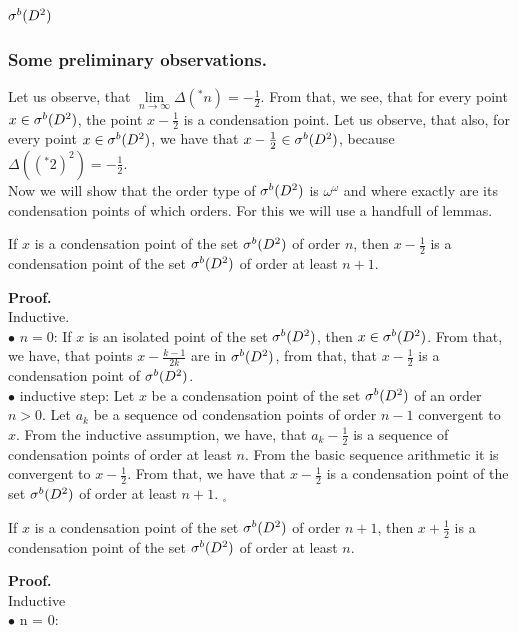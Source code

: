 \subsection{${\mathcal{\sigma}^b(D^2)}$}
\subsubsection{Some preliminary observations.}
Let us observe, that $\lim\limits_{n \to \infty} \Delta(^*n) = -\frac{1}{2}$. From that, we see, 
that for every point $x \in {\mathcal{\sigma}^b(D^2)}$, the point $x - \frac{1}{2}$ is a condensation point. 
Let us observe, that also, for every point $x \in {\mathcal{\sigma}^b(D^2)}$, we have that $x - \frac{1}{2} \in {\mathcal{\sigma}^b(D^2)}$, 
because $\Delta((^*2)^2) = -\frac{1}{2}$. \\

Now we will show that the order type of ${\mathcal{\sigma}^b(D^2)}$ is $\omega^\omega$ and where exactly are 
its condensation points of which orders. For this we will use  
a handfull of lemmas. 

\begin{lemma}
If $x$ is a condensation point of the set ${\mathcal{\sigma}^b(D^2)}$ of order $n$, then $x-\frac{1}{2}$ is a
 condensation point of the set ${\mathcal{\sigma}^b(D^2)}$ of order at least $n+1$. 
\end{lemma}
\textbf{Proof.} \\
Inductive. \\
$\bullet$ $n = 0$: If $x$ is an isolated point of the set ${\mathcal{\sigma}^b(D^2)}$, then $x \in {\mathcal{\sigma}^b(D^2)}$. From that, we 
have, that points $x - \frac{k-1}{2k}$ are in ${\mathcal{\sigma}^b(D^2)}$, from that, that $x-\frac{1}{2}$ is a 
condensation point of ${\mathcal{\sigma}^b(D^2)}$. \\
$\bullet$ inductive step: Let $x$ be a condensation point of the set ${\mathcal{\sigma}^b(D^2)}$ of an order $n > 0$. 
Let $a_k$ be a sequence od condensation points of order $n-1$ convergent to $x$. From the 
inductive assumption, we have, that $a_k - \frac{1}{2}$ is a sequence of condensation points 
of order at least $n$. From the basic sequence arithmetic it is convergent to $x-\frac{1}{2}$. 
From that, we have that $x-\frac{1}{2}$ is a condensation point of the set ${\mathcal{\sigma}^b(D^2)}$ of order 
at least $n+1$. $_\square$
\begin{lemma}
If $x$ is a condensation point of the set ${\mathcal{\sigma}^b(D^2)}$ of order $n+1$, then $x+\frac{1}{2}$ is 
a condensation point of the set ${\mathcal{\sigma}^b(D^2)}$ of order at least $n$.  
\end{lemma}
\textbf{Proof.} \\
Inductive \\
$\bullet$ n = 0: 






